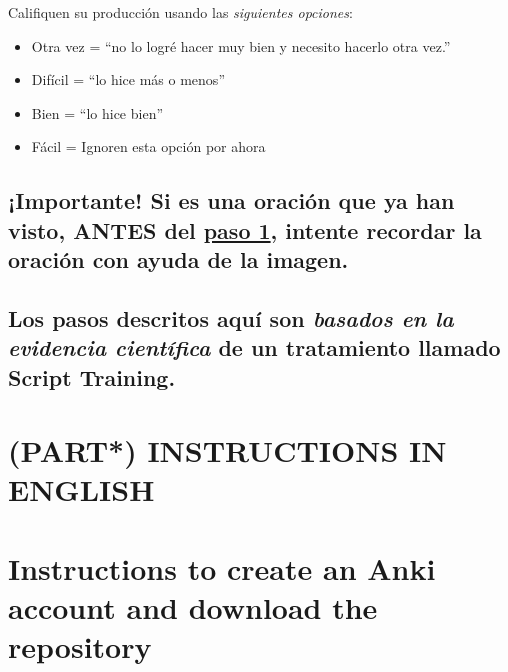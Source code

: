 \documentclass[
]{book}
\begin{document}
Califiquen su producción usando las \emph{siguientes opciones}:

\begin{itemize}
\item
  Otra vez = ``no lo logré hacer muy bien y necesito hacerlo otra vez.''
\item
  Difícil = ``lo hice más o menos''
\item
  Bien = ``lo hice bien''
\item
  Fácil = Ignoren esta opción por ahora
\end{itemize}

\hypertarget{importante-si-es-una-oraciuxf3n-que-ya-han-visto-antes-del-paso-1-intente-recordar-la-oraciuxf3n-con-ayuda-de-la-imagen.}{%
\section{\texorpdfstring{¡Importante! Si es una oración que \textbf{ya} han visto, ANTES del \protect\hyperlink{cross_2}{paso 1}, intente recordar la oración con ayuda de la imagen.}{¡Importante! Si es una oración que ya han visto, ANTES del paso 1, intente recordar la oración con ayuda de la imagen.}}\label{importante-si-es-una-oraciuxf3n-que-ya-han-visto-antes-del-paso-1-intente-recordar-la-oraciuxf3n-con-ayuda-de-la-imagen.}}

\hypertarget{los-pasos-descritos-aquuxed-son-basados-en-la-evidencia-cientuxedfica-de-un-tratamiento-llamado-script-training.}{%
\section{\texorpdfstring{Los pasos descritos aquí son \emph{basados en la evidencia científica} de un tratamiento llamado Script Training.}{Los pasos descritos aquí son basados en la evidencia científica de un tratamiento llamado Script Training.}}\label{los-pasos-descritos-aquuxed-son-basados-en-la-evidencia-cientuxedfica-de-un-tratamiento-llamado-script-training.}}

\hypertarget{part-instructions-in-english}{%
\chapter*{\texorpdfstring{(PART*) \textbf{INSTRUCTIONS IN ENGLISH}}{(PART*) INSTRUCTIONS IN ENGLISH}}\label{part-instructions-in-english}}

\hypertarget{cross_3}{%
\chapter{Instructions to create an Anki account and download the repository}\label{cross_3}}
\end{document}
